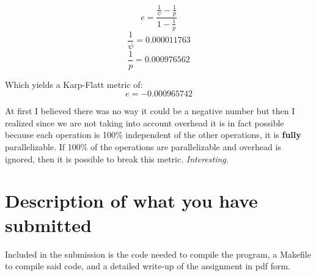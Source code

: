 \documentclass{article}
\begin{document}
$$e = \frac{\frac{1}{\psi} - \frac{1}{p}}{1 - \frac{1}{p}}$$
$$\frac{1}{\psi} = 0.000011763$$
$$\frac{1}{p} = 0.000976562$$

Which yields a Karp-Flatt metric of:
$$e = -0.000965742$$

At first I believed there was no way it could be a negative number but then I 
realized since we are not taking into account overhead it is in fact possible 
because each operation is 100\% independent of the other operations, it is 
\textbf{fully} parallelizable. If 100\% of the operations are parallelizable and 
overhead is ignored, then it is possible to break this metric. 
\textit{Interesting}.


\section{Description of what you have submitted}
Included in the submission is the code needed to compile the program, a Makefile 
to compile said code, and a detailed write-up of the assignment in pdf form.
\end{document}
